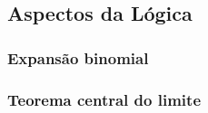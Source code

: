 \subsection{Aspectos da Lógica}
\lipsum[2]

\subsubsection{Expansão binomial}
\lipsum[2]

\subsubsection{Teorema central do limite}
\lipsum[2]
